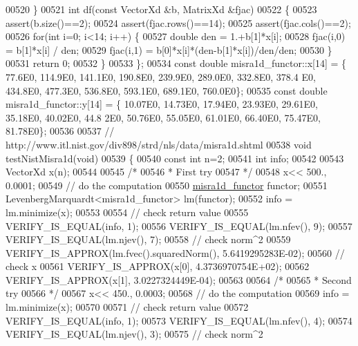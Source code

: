 \begin{DoxyCode}
00520     \}
00521     \textcolor{keywordtype}{int} df(\textcolor{keyword}{const} VectorXd &b, MatrixXd &fjac)
00522     \{
00523         assert(b.size()==2);
00524         assert(fjac.rows()==14);
00525         assert(fjac.cols()==2);
00526         \textcolor{keywordflow}{for}(\textcolor{keywordtype}{int} i=0; i<14; i++) \{
00527             \textcolor{keywordtype}{double} den = 1.+b[1]*x[i];
00528             fjac(i,0) = b[1]*x[i] / den;
00529             fjac(i,1) = b[0]*x[i]*(den-b[1]*x[i])/den/den;
00530         \}
00531         \textcolor{keywordflow}{return} 0;
00532     \}
00533 \};
00534 \textcolor{keyword}{const} \textcolor{keywordtype}{double} misra1d\_functor::x[14] = \{ 77.6E0, 114.9E0, 141.1E0, 190.8E0, 239.9E0, 289.0E0, 332.8E0, 378.4
      E0, 434.8E0, 477.3E0, 536.8E0, 593.1E0, 689.1E0, 760.0E0\};
00535 \textcolor{keyword}{const} \textcolor{keywordtype}{double} misra1d\_functor::y[14] = \{ 10.07E0, 14.73E0, 17.94E0, 23.93E0, 29.61E0, 35.18E0, 40.02E0, 44.8
      2E0, 50.76E0, 55.05E0, 61.01E0, 66.40E0, 75.47E0, 81.78E0\};
00536 
00537 \textcolor{comment}{// http://www.itl.nist.gov/div898/strd/nls/data/misra1d.shtml}
00538 \textcolor{keywordtype}{void} testNistMisra1d(\textcolor{keywordtype}{void})
00539 \{
00540   \textcolor{keyword}{const} \textcolor{keywordtype}{int} n=2;
00541   \textcolor{keywordtype}{int} info;
00542 
00543   VectorXd x(n);
00544 
00545   \textcolor{comment}{/*}
00546 \textcolor{comment}{   * First try}
00547 \textcolor{comment}{   */}
00548   x<< 500., 0.0001;
00549   \textcolor{comment}{// do the computation}
00550   \hyperlink{structmisra1d__functor}{misra1d\_functor} functor;
00551   LevenbergMarquardt<misra1d\_functor> lm(functor);
00552   info = lm.minimize(x);
00553 
00554   \textcolor{comment}{// check return value}
00555   VERIFY\_IS\_EQUAL(info, 1);
00556   VERIFY\_IS\_EQUAL(lm.nfev(), 9);
00557   VERIFY\_IS\_EQUAL(lm.njev(), 7);
00558   \textcolor{comment}{// check norm^2}
00559   VERIFY\_IS\_APPROX(lm.fvec().squaredNorm(), 5.6419295283E-02);
00560   \textcolor{comment}{// check x}
00561   VERIFY\_IS\_APPROX(x[0], 4.3736970754E+02);
00562   VERIFY\_IS\_APPROX(x[1], 3.0227324449E-04);
00563 
00564   \textcolor{comment}{/*}
00565 \textcolor{comment}{   * Second try}
00566 \textcolor{comment}{   */}
00567   x<< 450., 0.0003;
00568   \textcolor{comment}{// do the computation}
00569   info = lm.minimize(x);
00570 
00571   \textcolor{comment}{// check return value}
00572   VERIFY\_IS\_EQUAL(info, 1);
00573   VERIFY\_IS\_EQUAL(lm.nfev(), 4);
00574   VERIFY\_IS\_EQUAL(lm.njev(), 3);
00575   \textcolor{comment}{// check norm^2}

\end{DoxyCode}
